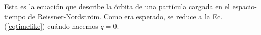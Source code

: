 Esta es la ecuación que describe la órbita de una partícula cargada en el espacio-tiempo de Reissner-Nordström. Como era esperado, se reduce a la Ec. (\ref{eqtimelike}) cuándo hacemos $q=0$.







